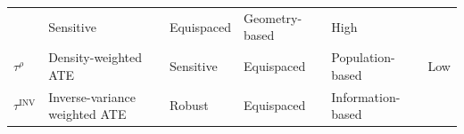 \documentclass[letter]{article}
\newcommand{\invvar}{\tau^{\mathrm{INV}}}
\newcommand{\taurho}{\tau^{\rho}}
\begin{document}
\begin{longtable}[]{@{}llllll@{}}
\begin{minipage}[t]{0.25\columnwidth}
\end{minipage} & \begin{minipage}[t]{0.13\columnwidth}\raggedright\strut
Sensitive\strut
\end{minipage} & \begin{minipage}[t]{0.13\columnwidth}\raggedright\strut
Equispaced\strut
\end{minipage} & \begin{minipage}[t]{0.15\columnwidth}\raggedright\strut
Geometry-based\strut
\end{minipage} & \begin{minipage}[t]{0.08\columnwidth}\raggedright\strut
High\strut
\end{minipage}\tabularnewline
\begin{minipage}[t]{0.09\columnwidth}\raggedright\strut
\(\taurho\)\strut
\end{minipage} & \begin{minipage}[t]{0.25\columnwidth}\raggedright\strut
Density-weighted ATE\strut
\end{minipage} & \begin{minipage}[t]{0.13\columnwidth}\raggedright\strut
Sensitive\strut
\end{minipage} & \begin{minipage}[t]{0.13\columnwidth}\raggedright\strut
Equispaced\strut
\end{minipage} & \begin{minipage}[t]{0.15\columnwidth}\raggedright\strut
Population-based\strut
\end{minipage} & \begin{minipage}[t]{0.08\columnwidth}\raggedright\strut
Low\strut
\end{minipage}\tabularnewline
\begin{minipage}[t]{0.09\columnwidth}\raggedright\strut
\(\invvar\)\strut
\end{minipage} & \begin{minipage}[t]{0.25\columnwidth}\raggedright\strut
Inverse-variance weighted ATE\strut
\end{minipage} & \begin{minipage}[t]{0.13\columnwidth}\raggedright\strut
Robust\strut
\end{minipage} & \begin{minipage}[t]{0.13\columnwidth}\raggedright\strut
Equispaced\strut
\end{minipage} & \begin{minipage}[t]{0.15\columnwidth}\raggedright\strut
Information-based\strut

\end{minipage}
\end{longtable}
\end{document}
